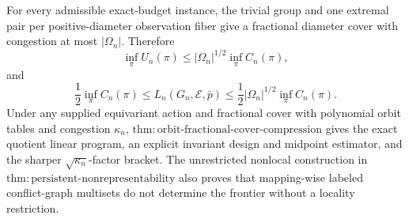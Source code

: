 For every admissible exact-budget instance, the trivial group and one extremal pair per positive-diameter observation fiber give a fractional diameter cover with congestion at most \(|\Omega_n|\). Therefore
\[
 \inf_\pi U_n(\pi)
 \le |\Omega_n|^{1/2}\inf_\pi C_n(\pi),
\]
and
\[
 \frac12\inf_\pi C_n(\pi)
 \le L_n(G_n,\mathcal E,\bar p)
 \le \frac12|\Omega_n|^{1/2}\inf_\pi C_n(\pi).
\]
Under any supplied equivariant action and fractional cover with polynomial orbit tables and congestion \(\kappa_n\), \(\mathrm{thm{:}orbit\text{-}fractional\text{-}cover\text{-}compression}\) gives the exact quotient linear program, an explicit invariant design and midpoint estimator, and the sharper \(\sqrt{\kappa_n}\)-factor bracket. The unrestricted nonlocal construction in \(\mathrm{thm{:}persistent\text{-}nonrepresentability}\) also proves that mapping-wise labeled conflict-graph multisets do not determine the frontier without a locality restriction.